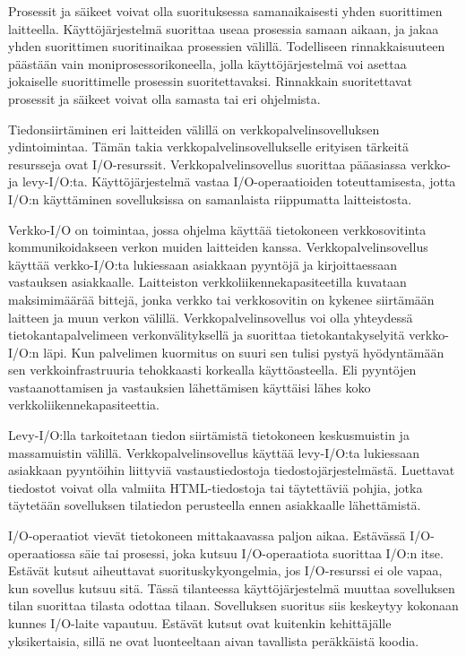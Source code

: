 \documentclass[finnish]{tktltiki2}
\theoremstyle{definition}
\theoremstyle{remark}
\begin{document}
Prosessit ja säikeet voivat olla suorituksessa samanaikaisesti
yhden suorittimen laitteella. Käyttöjärjestelmä suorittaa useaa prosessia
samaan aikaan, ja jakaa yhden suorittimen suoritinaikaa prosessien välillä.
Todelliseen rinnakkaisuuteen päästään vain moniprosessorikoneella, jolla
käyttöjärjestelmä voi asettaa jokaiselle suorittimelle prosessin suoritettavaksi.
Rinnakkain suoritettavat prosessit ja säikeet voivat olla samasta tai
eri ohjelmista.

Tiedonsiirtäminen eri laitteiden välillä on verkkopalvelinsovelluksen
ydintoimintaa.
Tämän takia verkkopalvelinsovellukselle erityisen tärkeitä resursseja ovat
I/O-resurssit.
Verkkopalvelinsovellus suorittaa pääasiassa verkko-ja levy-I/O:ta.
Käyttöjärjestelmä vastaa I/O-operaatioiden toteuttamisesta,
jotta I/O:n käyttäminen sovelluksissa on samanlaista
riippumatta laitteistosta.

Verkko-I/O on toimintaa, jossa ohjelma käyttää tietokoneen
verkkosovitinta kommunikoidakseen verkon muiden laitteiden kanssa.
Verkkopalvelinsovellus käyttää verkko-I/O:ta lukiessaan
asiakkaan pyyntöjä ja kirjoittaessaan vastauksen asiakkaalle.
Laitteiston verkkoliikennekapasiteetilla kuvataan maksimimäärää bittejä,
jonka verkko tai verkkosovitin on kykenee siirtämään laitteen ja muun
verkon välillä.
Verkkopalvelinsovellus voi olla yhteydessä tietokantapalvelimeen
verkonvälityksellä ja suorittaa tietokantakyselyitä verkko-I/O:n läpi.
Kun palvelimen kuormitus on suuri sen tulisi pystyä hyödyntämään
sen verkkoinfrastruuria tehokkaasti korkealla käyttöasteella. Eli
pyyntöjen vastaanottamisen ja vastauksien lähettämisen käyttäisi
lähes koko verkkoliikennekapasiteettia.

Levy-I/O:lla tarkoitetaan tiedon siirtämistä
tietokoneen keskusmuistin ja massamuistin välillä.
Verkkopalvelinsovellus käyttää levy-I/O:ta lukiessaan
asiakkaan pyyntöihin liittyviä vastaustiedostoja tiedostojärjestelmästä.
Luettavat tiedostot voivat olla valmiita HTML-tiedostoja tai täytettäviä
pohjia, jotka täytetään sovelluksen tilatiedon perusteella ennen
asiakkaalle lähettämistä.

I/O-operaatiot vievät tietokoneen mittakaavassa paljon
aikaa. Estävässä I/O-operaatiossa säie tai prosessi,
joka kutsuu I/O-operaatiota suorittaa I/O:n itse.
Estävät kutsut aiheuttavat suorituskykyongelmia, jos
I/O-resurssi ei ole vapaa, kun sovellus kutsuu sitä.
Tässä tilanteessa käyttöjärjestelmä muuttaa sovelluksen
tilan suorittaa tilasta odottaa tilaan. Sovelluksen suoritus
siis keskeytyy kokonaan kunnes I/O-laite vapautuu.
Estävät kutsut ovat kuitenkin kehittäjälle yksikertaisia, sillä
ne ovat luonteeltaan aivan tavallista peräkkäistä
koodia.
\end{document}
